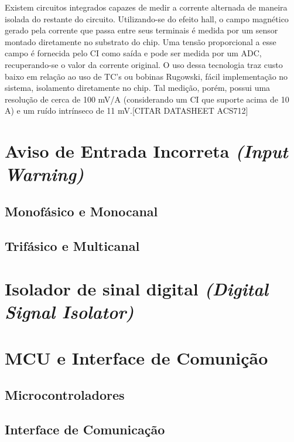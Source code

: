 Existem circuitos integrados capazes de medir a corrente alternada de maneira isolada do
restante do circuito. Utilizando-se do efeito hall, o campo magnético gerado pela corrente
que passa entre seus terminais é medida por um sensor montado diretamente no substrato
do chip. Uma tensão proporcional a esse campo é fornecida pelo CI como saída e pode ser
medida por um ADC, recuperando-se o valor da corrente original.
O uso dessa tecnologia traz custo baixo em relação ao uso de TC's ou bobinas Rugowski,
fácil implementação no sistema, isolamento diretamente no chip.
Tal medição, porém, possui uma resolução de cerca de 100 mV/A (considerando um CI que
suporte acima de 10 A) e um ruído intrínseco de 11 mV.[CITAR DATASHEET ACS712]

\section{Aviso de Entrada Incorreta \textit{(Input Warning)}}\label{sec:inpWarning}

    \subsection{Monofásico e Monocanal}\label{subsec:inpWMono}

    \subsection{Trifásico e Multicanal}\label{subsec:inpWMulti}

\section{Isolador de sinal digital \textit{(Digital Signal Isolator)}}\label{sec:DSIsolator}

\section{MCU e Interface de Comunição}\label{sec:MCUInterface}

    \subsection{Microcontroladores}\label{subsec:MCU}

    \subsection{Interface de Comunicação}\label{sec:Interface}